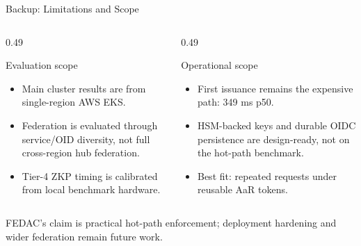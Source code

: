 \documentclass[aspectratio=169,11pt]{beamer}
\newcommand{\tightitems}{%
  \setlength{\topsep}{2pt}%
  \setlength{\itemsep}{4pt}%
  \setlength{\parsep}{0pt}%
}
\newcommand{\pinkbanner}[1]{%
  \begin{center}
  \begin{tcolorbox}[colback=fedacGray,colframe=fedacGray,
                    boxrule=0pt,arc=1mm,left=10pt,right=10pt,top=3pt,bottom=3pt,
                    width=0.96\linewidth,
                    borderline west={2pt}{0pt}{fedacTeal}]
  \footnotesize\color{fedacNavyD}#1
  \end{tcolorbox}
  \end{center}}
\begin{document}
{\begin{frame}[noframenumbering]{Backup: Limitations and Scope}
\vspace{2pt}
\begin{columns}[T,onlytextwidth]
\begin{column}{0.49\textwidth}
\begin{callout}{Evaluation scope}
\begin{itemize}\tightitems
\item Main cluster results are from single-region AWS EKS.
\item Federation is evaluated through service/OID diversity, not full cross-region hub federation.
\item Tier-4 ZKP timing is calibrated from local benchmark hardware.
\end{itemize}
\end{callout}
\end{column}
\begin{column}{0.49\textwidth}
\begin{callout}{Operational scope}
\begin{itemize}\tightitems
\item First issuance remains the expensive path: 349 ms p50.
\item HSM-backed keys and durable OIDC persistence are design-ready, not on the hot-path benchmark.
\item Best fit: repeated requests under reusable AaR tokens.
\end{itemize}
\end{callout}
\end{column}
\end{columns}
\vspace{4pt}
\pinkbanner{FEDAC's claim is practical hot-path enforcement; deployment hardening and wider federation remain future work.}
\end{frame}

}
\end{document}
